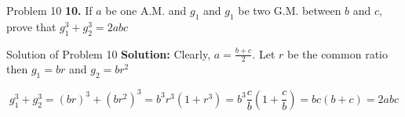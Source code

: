 \documentclass[aspectratio=1610,8pt]{beamer}
\begin{document}
\begin{frame}{Problem 10}
  \textbf{10.} If $a$ be one A.M. and $g_1$ and $g_1$ be two G.M. between $b$
  and $c,$ prove that $g_1^3 + g_2^3 = 2abc$
\end{frame}
\begin{frame}{Solution of Problem 10}
  \textbf{Solution:} Clearly, $a = \frac{b + c}{2}.$ Let $r$ be the common
  ratio then $g_1 = br$ and $g_2 = br^2$

  $$g_1^3 + g_2^3 = (br)^3 + (br^2)^3 = b^3r^3(1 + r^3) = b^3\frac{c}{b}\left(1
  + \frac{c}{b}\right) = bc(b + c) = 2abc$$
\end{frame}
\end{document}
